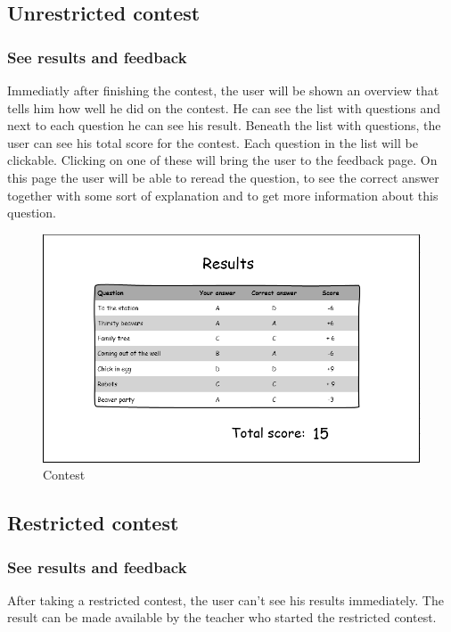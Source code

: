 \subsection*{Unrestricted contest}

\subsubsection*{See results and feedback}
Immediatly after finishing the contest, the user will be shown an overview that tells him how well he did on the contest. He can see the list with questions and next to each question he can see his result. Beneath the list with questions, the user can see his total score for the contest. Each question in the list will be clickable. Clicking on one of these will bring the user to the feedback page. On this page the user will be able to reread the question, to see the correct answer together with some sort of explanation and to get more information about this question.  

		\begin{figure}[h]
		  \centering
			\includegraphics[width=1\textwidth]{img/results.png}
		  \caption{Contest}
		  \label{Contest}
		\end{figure}

\subsection*{Restricted contest}

\subsubsection*{See results and feedback}
After taking a restricted contest, the user can't see his results immediately. The result can be made available by the teacher who started the restricted contest. 

